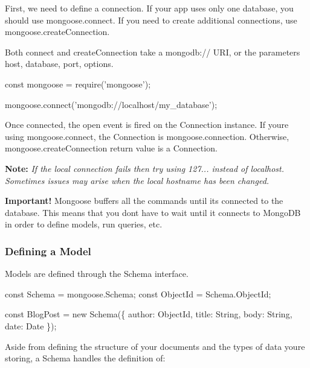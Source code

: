 First, we need to define a connection. If your app uses only one database, you should use {\ttfamily mongoose.\+connect}. If you need to create additional connections, use {\ttfamily mongoose.\+create\+Connection}.

Both {\ttfamily connect} and {\ttfamily create\+Connection} take a {\ttfamily mongodb\+://} U\+RI, or the parameters {\ttfamily host, database, port, options}.


\begin{DoxyCode}
const mongoose = require('mongoose');

mongoose.connect('mongodb://localhost/my\_database');
\end{DoxyCode}


Once connected, the {\ttfamily open} event is fired on the {\ttfamily Connection} instance. If you\textquotesingle{}re using {\ttfamily mongoose.\+connect}, the {\ttfamily Connection} is {\ttfamily mongoose.\+connection}. Otherwise, {\ttfamily mongoose.\+create\+Connection} return value is a {\ttfamily Connection}.

{\bfseries Note\+:} {\itshape If the local connection fails then try using 127... instead of localhost. Sometimes issues may arise when the local hostname has been changed.}

{\bfseries Important!} Mongoose buffers all the commands until it\textquotesingle{}s connected to the database. This means that you don\textquotesingle{}t have to wait until it connects to Mongo\+DB in order to define models, run queries, etc.

\subsubsection*{Defining a Model}

Models are defined through the {\ttfamily Schema} interface.


\begin{DoxyCode}
const Schema = mongoose.Schema;
const ObjectId = Schema.ObjectId;

const BlogPost = new Schema(\{
  author: ObjectId,
  title: String,
  body: String,
  date: Date
\});
\end{DoxyCode}


Aside from defining the structure of your documents and the types of data you\textquotesingle{}re storing, a Schema handles the definition of\+:


